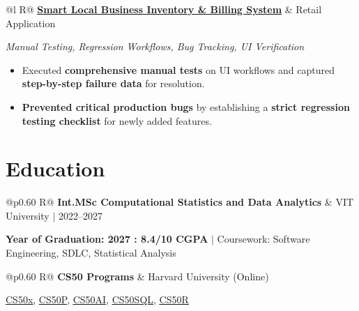 \documentclass[a4paper,10pt]{article}
\newcommand{\ulink}[2]{\href{#1}{\uline{#2}}}
\newcommand{\subheading}[1]{{\color[HTML]{0A0A0A}\fontsize{12}{14}\selectfont\bfseries #1}}
\newcommand{\techstack}[1]{{\color[HTML]{5C5C5C}\fontsize{10.5}{12.5}\selectfont\itshape #1}}
\newcommand{\meta}[1]{{\color[HTML]{5C5C5C}\fontsize{10.5}{12.5}\selectfont #1}}
\begin{document}
\begin{tabularx}{\linewidth}{@{}l R@{}}
\subheading{\ulink{https://github.com/su-jin1425/Smart-Local-Business-Inventory-Billing-System}{Smart Local Business Inventory \& Billing System}} & \meta{Retail Application}
\end{tabularx}
\vspace{1pt}
\techstack{Manual Testing, Regression Workflows, Bug Tracking, UI Verification}
\begin{itemize}[nosep, leftmargin=1.5em, itemsep=1pt, topsep=2pt]
  \item {\color[HTML]{0A0A0A}\fontsize{11}{14}\selectfont Executed \textbf{comprehensive manual tests} on UI workflows and captured \textbf{step-by-step failure data} for resolution.}
  \item {\color[HTML]{0A0A0A}\fontsize{11}{14}\selectfont \textbf{Prevented critical production bugs} by establishing a \textbf{strict regression testing checklist} for newly added features.}
\end{itemize}

\vspace{2pt}

\section{Education}
\vspace{2pt}

\begin{tabularx}{\linewidth}{@{}p{0.60\linewidth} R@{}}
\subheading{Int.MSc Computational Statistics and Data Analytics} & \meta{VIT University $|$ 2022--2027}
\end{tabularx}
\vspace{1pt}
{\color[HTML]{3A3A3A}\fontsize{11}{14}\selectfont \textbf{Year of Graduation: 2027 : 8.4/10 CGPA} $|$ Coursework: Software Engineering, SDLC, Statistical Analysis}

\begin{tabularx}{\linewidth}{@{}p{0.60\linewidth} R@{}}
\subheading{CS50 Programs} & \meta{Harvard University (Online)}
\end{tabularx}
\vspace{1pt}
{\color[HTML]{3A3A3A}\fontsize{11}{14}\selectfont \ulink{https://cs50.harvard.edu/certificates/b14b78df-e05c-413e-a607-1dd27303053a}{CS50x}, \ulink{https://cs50.harvard.edu/certificates/32477052-9db4-49c4-a5a4-d7e58429ca2c}{CS50P}, \ulink{https://cs50.harvard.edu/certificates/9cdb4d4a-1250-4f8e-9fd7-191864e0f919}{CS50AI}, \ulink{https://cs50.harvard.edu/certificates/bc486f24-f085-4e61-8536-80940b97a1b9}{CS50SQL}, \ulink{https://cs50.harvard.edu/certificates/666838e6-a053-4d82-b179-a60fe745fd84}{CS50R}}
\end{document}
